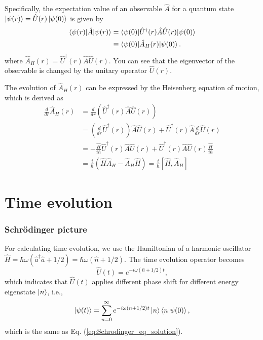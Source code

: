 \documentclass{book}
\begin{document}
Specifically, the expectation value of an observable $\hat A$ for a quantum state $\ket{\psi(r)} = \hat U(r)\ket{\psi(0)}$ is given by
\begin{equation}
\begin{aligned}
  \braket{\psi(r)|\hat A|\psi(r)} &= \braket{\psi(0)|\hat U^\dagger(r)\hat A\hat U(r)|\psi(0)}\\
  &\equiv \braket{\psi(0)|\hat A_H(r)|\psi(0)}.
\end{aligned}
\end{equation}
where $\hat A_H(r) = \hat U^\dagger(r) \hat A \hat U(r)$. You can see that the eigenvector of the observable is changed by the unitary operator $\hat U(r)$.

The evolution of $\hat A_H(r)$ can be expressed by the Heisenberg equation of motion, which is derived as
\begin{equation}
  \begin{aligned}
  	\frac{d}{dr}\hat A_H(r) &= \frac{d}{dr}\left(\hat U^\dagger(r)\hat A\hat U(r)\right)\\
  	&= \left( \frac{d}{dr}\hat U^\dagger(r) \right)\hat A\hat U(r) + \hat U^\dagger(r)\hat A\frac{d}{dr}\hat U(r)\\
  	&= -\frac{\hat H }{i\hbar}\hat U^\dagger(r) \hat A\hat U(r) + \hat U^\dagger(r) \hat A \hat U(r)\frac{\hat H }{i\hbar}\\
  	&= \frac{i}{\hbar}(\hat H\hat A_H - \hat A_H \hat H) = \frac{i}{\hbar}[\hat H, \hat A_H]
  	\label{eq:Heisenberg_eq_motion}
  \end{aligned}
\end{equation}

\section{Time evolution}
\subsubsection{Schr\"odinger picture}
For calculating time evolution, we use the Hamiltonian of a harmonic oscillator $\hat H = \hbar\omega(\hat a^\dagger\hat a + 1/2) = \hbar\omega (\hat n + 1/2)$. The time evolution operator becomes
\begin{equation}
  \hat U(t) = e^{-i\omega (\hat n + 1/2)t},
\end{equation}
which indicates that $\hat U(t)$ applies different phase shift for different energy eigenstate $\ket n$, i.e.,
\begin{equation}
  \ket {\psi(t)} = \sum_{n = 0}^{\infty}e^{-i\omega(n+1/2)t}\ket n \braket{n|\psi(0)},
\end{equation}
which is the same as Eq. (\ref{eq:Schrodinger_eq_solution}).
\end{document}
